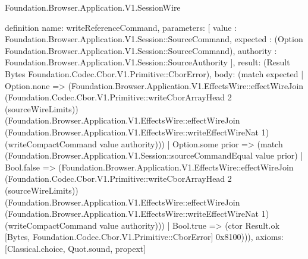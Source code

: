 \begin{lexlean}{Foundation.Browser.Application.V1.SessionWire}
\begin{semanticmodule}
definition{
  name: writeReferenceCommand,
  parameters: [
    value : Foundation.Browser.Application.V1.Session::SourceCommand,
    expected : (Option Foundation.Browser.Application.V1.Session::SourceCommand),
    authority : Foundation.Browser.Application.V1.Session::SourceAuthority
  ],
  result: (Result Bytes Foundation.Codec.Cbor.V1.Primitive::CborError),
  body: (match expected
    | Option.none => (Foundation.Browser.Application.V1.EffectsWire::effectWireJoin (Foundation.Codec.Cbor.V1.Primitive::writeCborArrayHead 2 (sourceWireLimits)) (Foundation.Browser.Application.V1.EffectsWire::effectWireJoin (Foundation.Browser.Application.V1.EffectsWire::writeEffectWireNat 1) (writeCompactCommand value authority)))
    | Option.some prior => (match (Foundation.Browser.Application.V1.Session::sourceCommandEqual value prior)
      | Bool.false => (Foundation.Browser.Application.V1.EffectsWire::effectWireJoin (Foundation.Codec.Cbor.V1.Primitive::writeCborArrayHead 2 (sourceWireLimits)) (Foundation.Browser.Application.V1.EffectsWire::effectWireJoin (Foundation.Browser.Application.V1.EffectsWire::writeEffectWireNat 1) (writeCompactCommand value authority)))
      | Bool.true => (ctor Result.ok [Bytes, Foundation.Codec.Cbor.V1.Primitive::CborError] 0x8100))),
  axioms: [Classical.choice, Quot.sound, propext]
}


\end{semanticmodule}
\end{lexlean}
